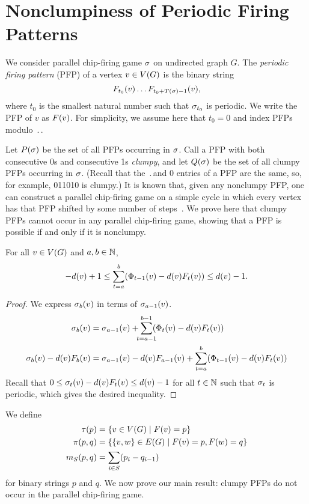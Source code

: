 \section{Nonclumpiness of Periodic Firing Patterns}\label{nonclumpiness}
We consider parallel chip-firing game $\s$ on undirected graph $G$. The
\emph{periodic firing pattern} (PFP) of a vertex $v \in \V$ is the binary
string
\[
  \firing{v}{t_0}\dots\firing{v}{t_0 + \period - 1},
\]
where $t_0$ is the smallest natural number such that $\pos{t_0}$ is
periodic. We write the PFP of $v$ as $\pfp{v}$. For simplicity, we assume here
that $t_0 = 0$ and index PFPs modulo $\period$.

Let $\pfps$ be the set of all PFPs occurring in $\s$. Call a PFP with both
consecutive 0s and consecutive 1s \emph{clumpy}, and let $\cpfps$ be the set of
all clumpy PFPs occurring in $\s$. (Recall that the $\period$\xth and 0\xth
entries of a PFP are the same, so, for example, 011010 is clumpy.) It is known
that, given any nonclumpy PFP, one can construct a parallel chip-firing game on
a simple cycle in which every vertex has that PFP shifted by some number of
steps~\cite{cycle}. We prove here that clumpy PFPs cannot occur in any parallel
chip-firing game, showing that a PFP is possible if and only if it is
nonclumpy.

\begin{lem}\label{strongbg}
For all $v \in \V$ and $a, b \in \nats$,
\begin{equation}\label{local}
  -\deg{v} + 1 \leq \sum_{t=a}^{b}(\receiving{v}{t-1} - \deg{v}\firing{v}{t})
  \leq \deg{v}-1.
\end{equation}
\end{lem}

\begin{proof}
We express $\chips{v}{b}$ in terms of $\chips{v}{a-1}$.
\begin{align*}
  \chips{v}{b} &= \chips{v}{a-1} +
  \smashoperator{\sum_{t=a-1}}^{b-1}(\receiving{v}{t} - \deg{v}\firing{v}{t})
  \\
  \chips{v}{b} - \deg{v}\firing{v}{b} &= \chips{v}{a-1} -
  \deg{v}\firing{v}{a-1} + \sum_{t=a}^{b}(\receiving{v}{t-1} -
  \deg{v}\firing{v}{t})
\end{align*}
Recall that $0 \leq \chips{v}{t} - \deg{v}\firing{v}{t} \leq \deg{v} - 1$ for
all $t \in \nats$ such that $\pos{t}$ is periodic, which gives the desired
inequality.
\end{proof}

We define
\begin{align*}
\pfpverts{p} &= {\set{v \in \V}{\pfp{v}=p}} \\
\pfpedges{p}{q} &= {\set{\{v,w\} \in \E}{\pfp{v}=p, \pfp{w} = q}} \\
\misb{S}{p}{q} &= \sum_{i \in S}(p_{i} - q_{i-1})
\end{align*}
for binary strings $p$ and $q$. We now prove our main result: clumpy PFPs do
not occur in the parallel chip-firing game.

